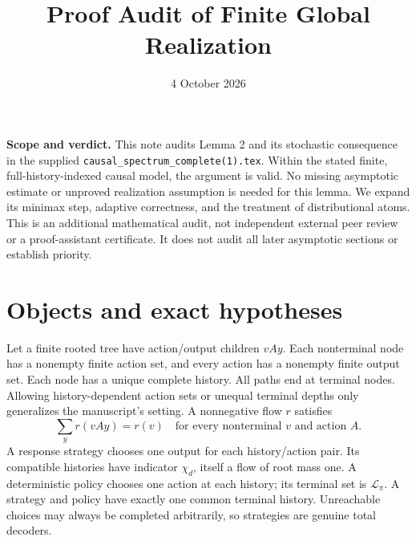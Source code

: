 \documentclass[11pt,a4paper]{article}
\title{Proof Audit of Finite Global Realization}
\author{}
\date{4 October 2026}
\begin{document}
\maketitle
\noindent\textbf{Scope and verdict.}
This note audits Lemma 2 and its stochastic consequence in the supplied
\texttt{causal\_spectrum\_complete(1).tex}. Within the stated finite,
full-history-indexed causal model, the argument is valid. No missing
asymptotic estimate or unproved realization assumption is needed for this
lemma. We expand its minimax step, adaptive correctness, and the treatment
of distributional atoms. This is an additional mathematical audit, not
independent external peer review or a proof-assistant certificate. It does
not audit all later asymptotic sections or establish priority.

\section{Objects and exact hypotheses}
Let a finite rooted tree have action/output children $vAy$. Each nonterminal
node has a nonempty finite action set, and every action has a nonempty
finite output set. Each node has a unique complete history. All paths end
at terminal nodes. Allowing history-dependent action sets or unequal terminal
depths only generalizes the manuscript's setting.
A nonnegative flow $r$ satisfies
\[
\sum_y r(vAy)=r(v)\quad\text{for every nonterminal }v\text{ and action }A.
\]
A response strategy chooses one output for each history/action pair. Its
compatible histories have indicator $\chi_d$, itself a flow of root mass
one. A deterministic policy chooses one action at each history; its
terminal set is $\mathcal L_\pi$. A strategy and policy have exactly one
common terminal history. Unreachable choices may always be completed
arbitrarily, so strategies are genuine total decoders.
\end{document}
